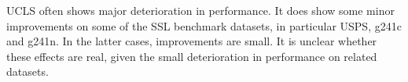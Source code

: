 \documentclass{elsarticle}
\begin{document}
UCLS often shows major deterioration in performance. It does show some minor improvements on some of the SSL benchmark datasets, in particular USPS, g241c and g241n. In the latter cases, improvements are small. It is unclear whether these effects are real, given the small deterioration in performance on related datasets.



\end{document}
